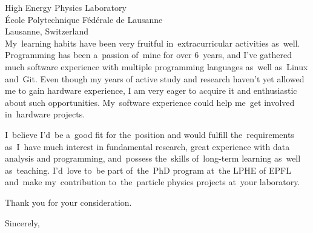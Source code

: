\documentclass[a4paper]{letter}
\begin{document}
\begin{letter}{
    High Energy Physics Laboratory \\
    \'{E}cole Polytechnique F\'{e}d\'{e}rale de Lausanne \\
    Lausanne, Switzerland \\
}
    My~learning habits have been very fruitful {in~extracurricular 
    activities} as~well. Programming has been a~passion of~mine for over 
    6~years, and I've gathered much software experience with multiple 
    programming languages as~well as~Linux and~Git.
    Even though my years of active study and research haven't yet 
    allowed me to gain hardware experience, I am very eager to acquire 
    it and enthusiastic about such opportunities. My~software experience 
    could help me~get involved in~hardware projects.

    I~believe I'd~be a~good fit for the~position and would fulfill 
    the~requirements as~I~have much interest in fundamental research, 
    great experience with data analysis and programming, and~possess 
    the~skills of~long-term learning as~well as~teaching. I'd~love to~be 
    part of~the~PhD program at~the LPHE of EPFL and~make my~contribution 
    to~the~particle physics projects at~your laboratory.

    \medskip
    Thank you for your consideration.

    \closing{Sincerely,}
\end{letter}
\end{document}
